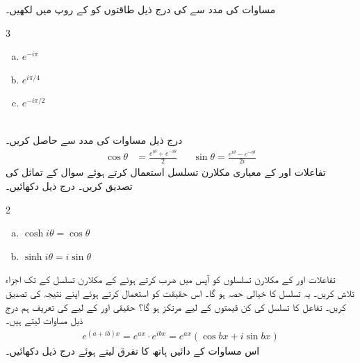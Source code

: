  مساوات  کی مدد سے   کی درج ذیل  طاقتوں کو   کے روپ میں لکھیں۔
\begin{multicols}{3}
\begin{enumerate}[a.]
\item
$e^{-i\pi}$
\item
$e^{i\pi/4}$
\item
$e^{-i\pi/2}$
\end{enumerate}
\end{multicols}
\\
درج ذیل مساوات  کی مدد سے حاصل کریں۔
\begin{align*}
\cos \theta&=\frac{e^{i\theta}+e^{-i\theta}}{2} && \sin \theta=\frac{e^{i\theta}-e^{-i\theta}}{2i}
\end{align*}
تفاعلات  اور  کے معیاری مکلارن تسلسل استعمال کرتے ہوئے سوال  کے تماثل کی تصدیق کریں۔
درج ذیل دکھائیں۔
\begin{multicols}{2}
\begin{enumerate}[a.]
\item
$\cosh i\theta=\cos \theta$
\item
$\sinh i\theta=i\sin \theta$
\end{enumerate}
\end{multicols}
تفاعلات   اور  کے مکلارن تسلسلوں کو آپس میں ضرب کرتے ہوئے  کے مکلارن تسلسل کے  تک اجزاء تلاش کریں۔ یہ تسلسل  کا خیالی حصہ ہو گا۔ اس حقیقت کو استعمال کرتے ہوئے اپنے نتیجہ کی تصدیق کریں۔ تفاعل  کا تسلسل  کی کن قیمتوں کے لیے مرتکز ہو گا؟
حقیقی  اور  کے لیے   کی تعریف ہم  درج ذیل مساوات لیتے ہیں۔
\begin{align*}
e^{(a+ib)x}=e^{ax}\cdot e^{ibx}=e^{ax}(\cos bx+i\sin bx)
\end{align*}
اس مساوات کے دائیں ہاتھ کا تفرق لیتے ہوئے درج ذیل دکھائیں۔
